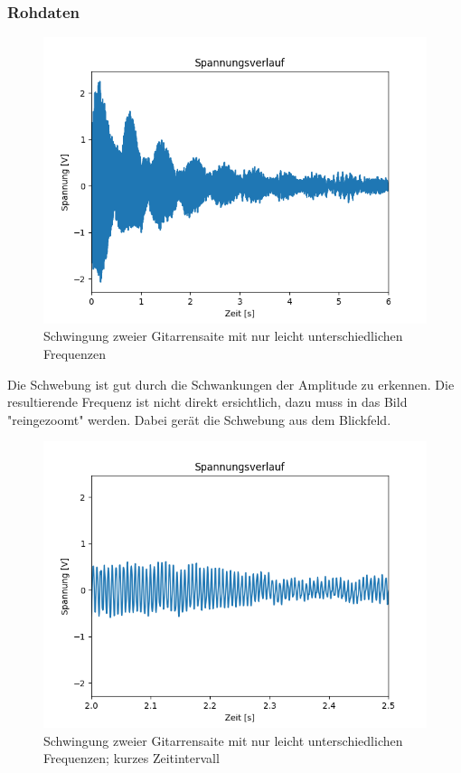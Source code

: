 \documentclass[12pt,a4paper]{article}
\begin{document}
\subsubsection{Rohdaten}
\begin{figure}
\includegraphics[scale=1]{Bilder/Schwebung_roh.png}
\centering
\caption{Schwingung zweier Gitarrensaite mit nur leicht unterschiedlichen Frequenzen}
\label{Schwebung_roh}
\end{figure}
Die Schwebung ist gut durch die Schwankungen der Amplitude zu erkennen. Die resultierende Frequenz ist nicht direkt ersichtlich, dazu muss in das Bild "reingezoomt" werden. Dabei gerät die Schwebung aus dem Blickfeld.
\begin{figure}
\includegraphics[scale=0.9]{Bilder/Schwebung_reingezoomt.png}
\centering
\caption{Schwingung zweier Gitarrensaite mit nur leicht unterschiedlichen Frequenzen; kurzes Zeitintervall}
\label{Schwebung_zoom}
\end{figure}
\end{document}
